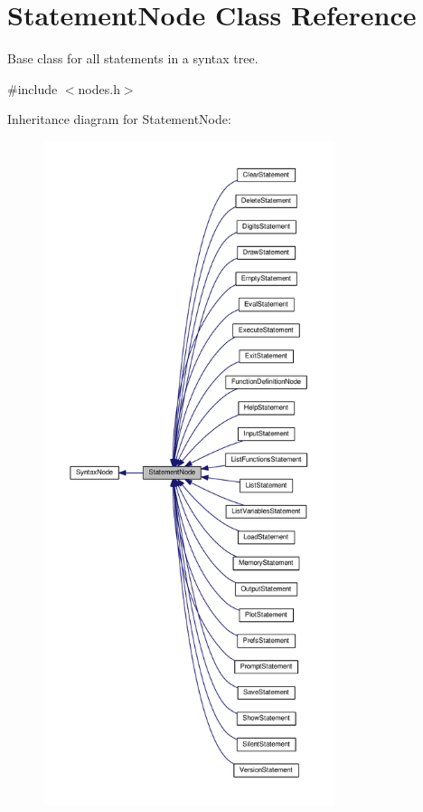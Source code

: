 \hypertarget{classStatementNode}{}\section{Statement\+Node Class Reference}
\label{classStatementNode}


Base class for all statements in a syntax tree.  




{\ttfamily \#include $<$nodes.\+h$>$}



Inheritance diagram for Statement\+Node\+:
\nopagebreak
\begin{figure}[H]
\begin{center}
\leavevmode
\includegraphics[height=550pt]{df/dc8/classStatementNode__inherit__graph}
\end{center}
\end{figure}


